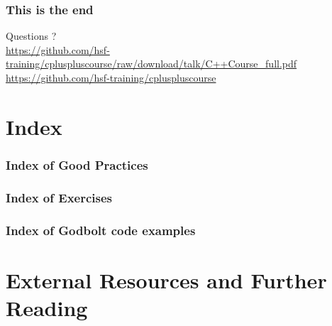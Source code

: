 \documentclass[compress]{beamer}
\begin{document}
\begin{frame}
  \frametitle{This is the end}
  \begin{center}
    \Huge Questions ?\\
    \vspace{.5cm}
    \tiny \url{https://github.com/hsf-training/cpluspluscourse/raw/download/talk/C++Course\_full.pdf}\\
    \tiny \url{https://github.com/hsf-training/cpluspluscourse}
  \end{center}
\end{frame}

\appendix

\section*{Index}

\begin{frame}
  \frametitle{Index of Good Practices}
  \listofgoodpractices
\end{frame}

\begin{frame}
  \frametitle{Index of Exercises}
  \listofexercises
\end{frame}

\begin{frame}
  \frametitle{Index of Godbolt code examples}
  \listofgodbolt
\end{frame}

\section*{External Resources and Further Reading}
\end{document}
